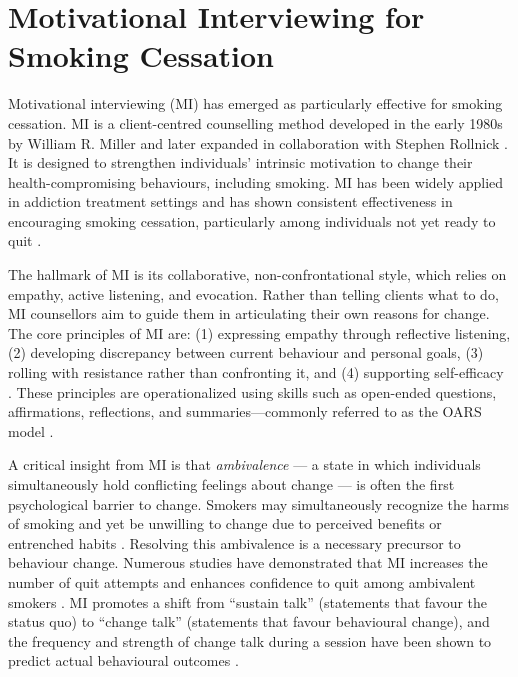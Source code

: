 \section{Motivational Interviewing for Smoking Cessation}

Motivational interviewing (MI) has emerged as particularly effective for smoking cessation. MI is a client-centred counselling method developed in the early 1980s by William R. Miller and later expanded in collaboration with Stephen Rollnick \cite{miller1991motivational,MillerRollnick2023}. It is designed to strengthen individuals' intrinsic motivation to change their health-compromising behaviours, including smoking. MI has been widely applied in addiction treatment settings and has shown consistent effectiveness in encouraging smoking cessation, particularly among individuals not yet ready to quit \cite{bischof2021evidence,hettema2005meta}.

The hallmark of MI is its collaborative, non-confrontational style, which relies on empathy, active listening, and evocation. Rather than telling clients what to do, MI counsellors aim to guide them in articulating their own reasons for change. The core principles of MI are: (1) expressing empathy through reflective listening, (2) developing discrepancy between current behaviour and personal goals, (3) rolling with resistance rather than confronting it, and (4) supporting self-efficacy \cite{rollnick2008motivational}. These principles are operationalized using skills such as open-ended questions, affirmations, reflections, and summaries---commonly referred to as the OARS model \cite{Miller_2023}.


A critical insight from MI is that \emph{ambivalence} --- a state in which individuals simultaneously hold conflicting feelings about change --- is often the first psychological barrier to change. Smokers may simultaneously recognize the harms of smoking and yet be unwilling to change due to perceived benefits or entrenched habits \cite{brown2023mi}. Resolving this ambivalence is a necessary precursor to behaviour change. Numerous studies have demonstrated that MI increases the number of quit attempts and enhances confidence to quit among ambivalent smokers \cite{Abar2013, Gwaltney2009-wj}. MI promotes a shift from ``sustain talk'' (statements that favour the status quo) to ``change talk'' (statements that favour behavioural change), and the frequency and strength of change talk during a session have been shown to predict actual behavioural outcomes \cite{Apodaca2009}.

